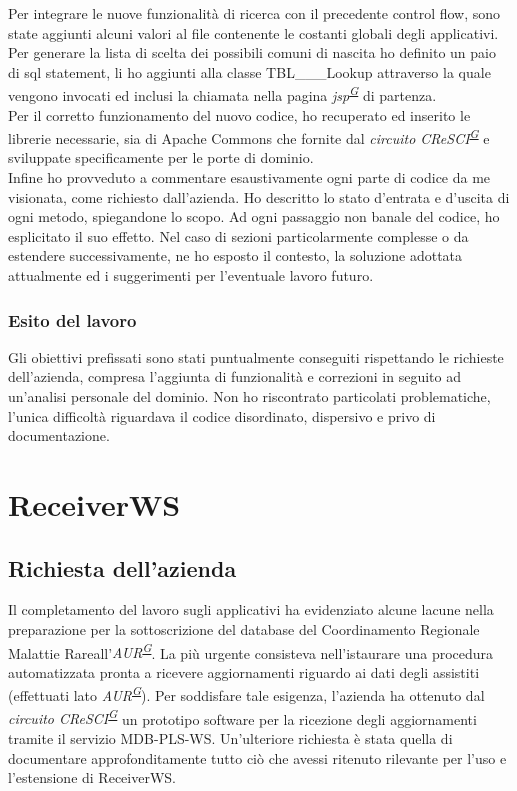 \documentclass[a4paper]{article}
\newcommand{\crmr}{Coordinamento Regionale Malattie Rare}
\begin{document}
\noindent Per integrare le nuove funzionalità di ricerca con il precedente control flow, sono state aggiunti alcuni valori al file contenente le costanti globali degli applicativi.
\\
Per generare la lista di scelta dei possibili comuni di nascita ho definito un paio di sql statement, li ho aggiunti alla classe TBL\_\_\_Lookup attraverso la quale vengono invocati ed inclusi la chiamata nella pagina \textit{jsp\textsuperscript{\hyperref[sec:gl]{G}}} di partenza.
\\
Per il corretto funzionamento del nuovo codice, ho recuperato ed inserito le librerie necessarie, sia di Apache Commons che fornite dal \textit{circuito CReSCI\textsuperscript{\hyperref[sec:gl]{G}}} e sviluppate specificamente per le porte di dominio.
\\
Infine ho provveduto a commentare esaustivamente ogni parte di codice da me visionata, come richiesto dall'azienda. Ho descritto lo stato d'entrata e d'uscita di ogni metodo, spiegandone lo scopo. Ad ogni passaggio non banale del codice, ho esplicitato il suo effetto. Nel caso di sezioni particolarmente complesse o da estendere successivamente, ne ho esposto il contesto, la soluzione adottata attualmente ed i suggerimenti per l'eventuale lavoro futuro.

\subsubsection{Esito del lavoro}
Gli obiettivi prefissati sono stati puntualmente conseguiti rispettando le richieste dell'azienda, compresa l'aggiunta di funzionalità e correzioni in seguito ad un'analisi personale del dominio. Non ho riscontrato particolati problematiche, l'unica difficoltà riguardava il codice disordinato, dispersivo e privo di documentazione.

\newpage

\section{ReceiverWS}

\subsection{Richiesta dell'azienda}
Il completamento del lavoro sugli applicativi ha evidenziato alcune lacune nella preparazione per la sottoscrizione del database del \crmr all'\textit{AUR\textsuperscript{\hyperref[sec:gl]{G}}}. La più urgente consisteva nell'istaurare una procedura automatizzata pronta a ricevere aggiornamenti riguardo ai dati degli assistiti (effettuati lato \textit{AUR\textsuperscript{\hyperref[sec:gl]{G}}}). Per soddisfare tale esigenza, l'azienda ha ottenuto dal \textit{circuito CReSCI\textsuperscript{\hyperref[sec:gl]{G}}} un prototipo software per la ricezione degli aggiornamenti tramite il servizio MDB-PLS-WS. Un'ulteriore richiesta è stata quella di documentare approfonditamente tutto ciò che avessi ritenuto rilevante per l'uso e l'estensione di ReceiverWS.
\end{document}

